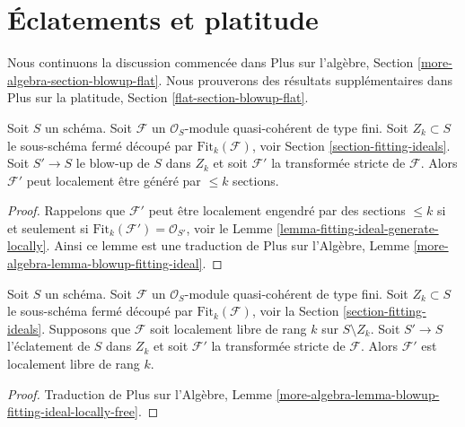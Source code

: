 \section{Éclatements et platitude}
\label{section-blowup-flat}

\noindent
Nous continuons la discussion commencée dans Plus sur l'algèbre, Section
 \ref{more-algebra-section-blowup-flat}. Nous prouverons des résultats supplémentaires dans Plus sur la
platitude, Section  \ref{flat-section-blowup-flat}.


\begin{lemma}
\label{lemma-strict-transform-blowup-fitting-ideal}
Soit  $S$  un schéma. Soit  $\mathcal{F}$  un  $\mathcal{O}_S$-module
quasi-cohérent de type fini. Soit  $Z_k \subset S$  le sous-schéma fermé découpé par
 $\text{Fit}_k(\mathcal{F})$, voir Section  \ref{section-fitting-ideals}. Soit  $S' \to S$  le blow-up de
 $S$  dans  $Z_k$  et soit  $\mathcal{F}'$  la transformée stricte de
 $\mathcal{F}$. Alors  $\mathcal{F}'$  peut localement être généré par  $\leq k$ 
sections.
\end{lemma}

\begin{proof}
Rappelons que  $\mathcal{F}'$  peut être localement engendré par des sections
 $\leq k$  si et seulement si  $\text{Fit}_k(\mathcal{F}') = \mathcal{O}_{S'}$, voir le Lemme  \ref{lemma-fitting-ideal-generate-locally}. Ainsi ce
lemme est une traduction de Plus sur l’Algèbre, Lemme  \ref{more-algebra-lemma-blowup-fitting-ideal}.
\end{proof}

\begin{lemma}
\label{lemma-strict-transform-blowup-fitting-ideal-locally-free}
Soit  $S$  un schéma. Soit  $\mathcal{F}$  un  $\mathcal{O}_S$-module
quasi-cohérent de type fini. Soit  $Z_k \subset S$  le sous-schéma fermé découpé par
 $\text{Fit}_k(\mathcal{F})$, voir la Section  \ref{section-fitting-ideals}. Supposons que  $\mathcal{F}$  soit
localement libre de rang  $k$  sur  $S \setminus Z_k$. Soit  $S' \to S$ 
l’éclatement de  $S$  dans  $Z_k$  et soit  $\mathcal{F}'$  la transformée
stricte de  $\mathcal{F}$. Alors  $\mathcal{F}'$  est localement libre de rang
 $k$.
\end{lemma}

\begin{proof}
Traduction de Plus sur l’Algèbre, Lemme  \ref{more-algebra-lemma-blowup-fitting-ideal-locally-free}.
\end{proof}

